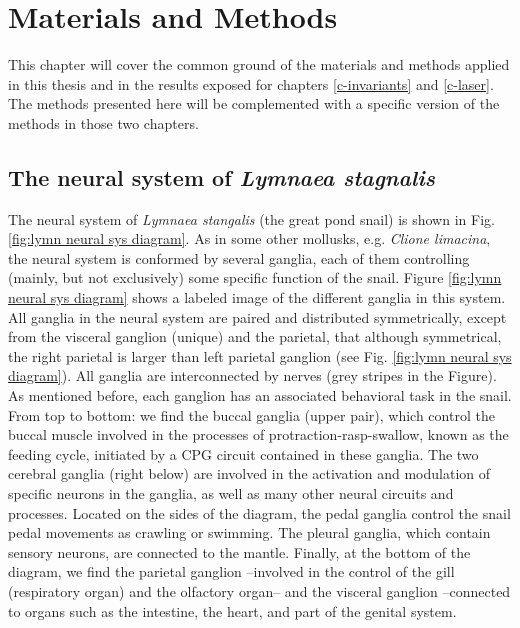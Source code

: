 \chapter{Materials and Methods}
This chapter will cover the common ground of the materials and methods applied in this thesis and in the results exposed for chapters \ref{c-invariants} and \ref{c-laser}. The methods presented here will be complemented with a specific version of the methods in those two chapters.

\section{The neural system of \textit{Lymnaea stagnalis}}
\label{sec:lymnaea morphology}
The neural system of \textit{Lymnaea stangalis} (the great pond snail) is shown in Fig. \ref{fig:lymn neural sys diagram}. As in some other mollusks, e.g. {\sl Clione limacina}, the neural system is conformed by several ganglia, each of them controlling (mainly, but not exclusively) some specific function of the snail. Figure \ref{fig:lymn neural sys diagram} shows a labeled image of the different ganglia in this system. All ganglia in the neural system are paired and distributed symmetrically, except from the visceral ganglion (unique) and the parietal, that although symmetrical, the right parietal is larger than left parietal ganglion (see Fig. \ref{fig:lymn neural sys diagram}). All ganglia are interconnected by nerves (grey stripes in the Figure). As mentioned before, each ganglion has an associated behavioral task in the snail. From top to bottom: we find the buccal ganglia (upper pair), which control the buccal muscle involved in the processes of protraction-rasp-swallow, known as the feeding cycle, initiated by a CPG circuit contained in these ganglia. The two cerebral ganglia (right below) are involved in the activation and modulation of specific neurons in the ganglia, as well as many other neural circuits and processes. Located on the sides of the diagram, the pedal ganglia control the snail pedal movements as crawling or swimming. The pleural ganglia, which contain sensory neurons, are connected to the mantle. Finally, at the bottom of the diagram, we find the parietal ganglion --involved in the control of the gill (respiratory organ) and the olfactory organ-- and the visceral ganglion --connected to organs such as the intestine, the heart, and part of the genital system.


